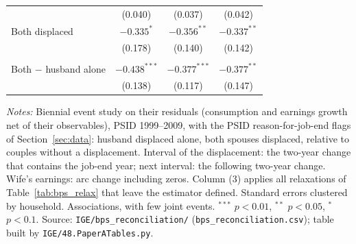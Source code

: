 \begin{table}[!htbp]
{\begin{tabular}{lccc}
 & (0.040) & (0.037) & (0.042) \\
Both displaced & $-0.335^{*}$ & $-0.356^{**}$ & $-0.337^{**}$ \\
 & (0.178) & (0.140) & (0.142) \\
\addlinespace
\multicolumn{4}{l}{\textit{Wife's earnings, arc change, interval of the displacement}} \\
Both $-$ husband alone & $-0.438^{***}$ & $-0.377^{***}$ & $-0.377^{**}$ \\
 & (0.138) & (0.117) & (0.147) \\
\bottomrule
\end{tabular}}
\par\smallskip
\begin{minipage}{\textwidth}\footnotesize \textit{Notes:} Biennial event study on their residuals (consumption and earnings growth net of their observables), PSID 1999--2009, with the PSID reason-for-job-end flags of Section~\ref{sec:data}: husband displaced alone, both spouses displaced, relative to couples without a displacement. Interval of the displacement: the two-year change that contains the job-end year; next interval: the following two-year change. Wife's earnings: arc change including zeros. Column (3) applies all relaxations of Table~\ref{tab:bps_relax} that leave the estimator defined. Standard errors clustered by household. Associations, with few joint events. $^{***}$ $p<0.01$, $^{**}$ $p<0.05$, $^{*}$ $p<0.1$. Source: \texttt{IGE/bps\_reconciliation/} (\texttt{bps\_reconciliation.csv}); table built by \texttt{IGE/48.PaperATables.py}.\end{minipage}
\end{table}
